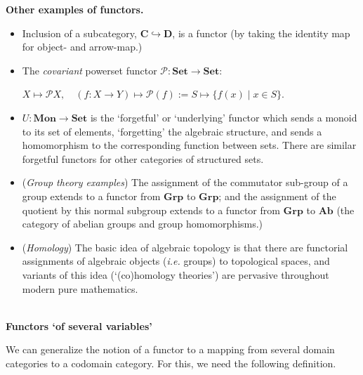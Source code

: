 \documentclass[]{amsbook}
\newcommand{\q}{\quad}
\newcommand{\catname}[1]{\mathbf{#1}}
\newcommand{\0}{\mathbf{0}}
\newcommand{\1}{\mathbf{1}}
\newcommand{\mc}[1]{\mathcal{#1}}
\begin{document}
\textbf{Other examples of functors.}
\begin{itemize}
    \item Inclusion of a subcategory, $\catname{C} \hookrightarrow \catname{D}$,
    is a functor (by taking the identity map for object- and arrow-map.)

    \item The \emph{covariant} powerset functor $\mc{P}: \catname{Set} \to
    \catname{Set}$:
    \begin{center}
        $X \mapsto \mc{P}X, \q (f: X \to Y) \mapsto \mc{P}(f) :=
        S \mapsto \{ f(x) \mid x \in S \}$.
    \end{center}

    \item $U: \catname{Mon} \to \catname{Set}$ is the `forgetful' or
    `underlying' functor which sends a monoid to its set of elements,
    `forgetting' the algebraic structure, and sends a homomorphism to the
    corresponding function between sets. There are similar forgetful functors
    for other categories of structured sets.

    \item (\emph{Group theory examples}) The assignment of the commutator
    sub-group of a group extends to a functor from $\catname{Grp}$ to
    $\catname{Grp}$; and the assignment of the quotient by this normal
    subgroup extends to a functor from $\catname{Grp}$ to $\catname{Ab}$ (the
    category of abelian groups and group homomorphisms.)

    \item (\emph{Homology}) The basic idea of algebraic topology is that there
    are functorial assignments of algebraic objects (\emph{i.e.} groups) to
    topological spaces, and variants of this idea (`(co)homology theories') are
    pervasive throughout modern pure mathematics.
\end{itemize}
~\\

\textbf{Functors `of several variables'}

We can generalize the notion of a functor to a mapping from several domain
categories to a codomain category. For this, we need the following definition.\\
\end{document}
